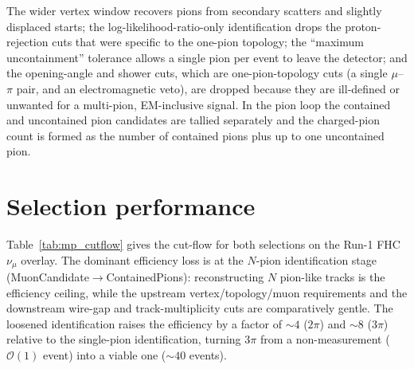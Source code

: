 \documentclass[11pt,a4paper]{article}
\begin{document}
The wider vertex window recovers pions from secondary scatters and slightly displaced
starts; the log-likelihood-ratio-only identification drops the proton-rejection cuts that
were specific to the one-pion topology; the ``maximum uncontainment'' tolerance allows a
single pion per event to leave the detector; and the opening-angle and shower cuts, which
are one-pion-topology cuts (a single $\mu$--$\pi$ pair, and an electromagnetic veto), are
dropped because they are ill-defined or unwanted for a multi-pion, EM-inclusive signal.
In the pion loop the contained and uncontained pion candidates are tallied separately and
the charged-pion count is formed as the number of contained pions plus up to one
uncontained pion.

\section{Selection performance}
\label{sec:performance}

Table~\ref{tab:mp_cutflow} gives the cut-flow for both selections on the Run-1 FHC
$\nu_\mu$ overlay. The dominant efficiency loss is at the $N$-pion identification stage
(MuonCandidate$\rightarrow$ContainedPions): reconstructing $N$ pion-like tracks is the
efficiency ceiling, while the upstream vertex/topology/muon requirements and the
downstream wire-gap and track-multiplicity cuts are comparatively gentle. The loosened
identification raises the efficiency by a factor of $\sim\!4$ ($2\pi$) and $\sim\!8$
($3\pi$) relative to the single-pion identification, turning $3\pi$ from a
non-measurement ($\mathcal{O}(1)$ event) into a viable one ($\sim\!40$ events).
\end{document}
